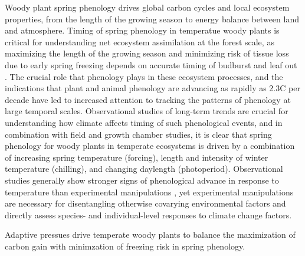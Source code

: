 \documentclass[11pt]{article}
\begin{document}

Woody plant spring phenology drives global carbon cycles and local ecosystem properties, from the length of the growing season to energy balance between land and atmosphere. Timing of spring phenology in temperatue woody plants is critical for understanding net ecosystem assimilation at the forest scale, as maximizing the length of the growing season and minimizing risk of tissue loss due to early spring freezing depends on accurate timing of budburst and leaf out \cite{Basler:2014aa}. The crucial role that phenology plays in these ecosystem processes, and the indications that plant and animal phenology are advancing as rapidly as 2.3\degree C per decade \cite{Menzel:2006} have led to increased attention to tracking the patterns of phenology at large temporal scales. Observational studies of long-term trends are crucial for understanding how climate affects timing of such phenological events, and in combination with field and growth chamber studies, it is clear that spring phenology for woody plants in temperate ecosystems is driven by a combination of increasing spring temperature (forcing), length and intensity of winter temperature (chilling), and changing daylength (photoperiod). Observational studies generally show stronger signs of phenological advance in response to temperature than experimental manipulations \cite{Wolkovich:2012aa}, yet experimental manipulations are necessary for disentangling otherwise covarying environmental factors and directly assess species- and individual-level responses to climate change factors. 



Adaptive pressues drive temperate woody plants to balance the maximization of carbon gain with minimzation of freezing risk in spring phenology. 
\end{document}
